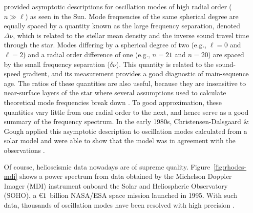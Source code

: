 \citet{1980ApJS...43..469T} provided asymptotic descriptions for oscillation modes of high radial order (${n\gg\ell}$) as seen in the Sun. 
Mode frequencies of the same spherical degree are equally spaced by a quantity known as the large frequency separation, denoted ${\Delta\nu}$, which is related to the stellar mean density and the inverse sound travel time through the star. 
Modes differing by a spherical degree of two (e.g., ${\ell=0}$ and ${\ell=2}$) and a radial order difference of one (e.g., ${n=21}$ and ${n=20}$) are spaced by the small frequency separation (${\delta\nu}$). 
This quantity is related to the sound-speed gradient, and its measurement provides a good diagnostic of main-sequence age. 
The ratios of these quantities are also useful, because they are insensitive to near-surface layers of the star where several assumptions used to calculate theoretical mode frequencies break down \citep[e.g.,][]{2003A&A...411..215R}. 
To good approximation, these quantities vary little from one radial order to the next, and hence serve as a good summary of the frequency spectrum. 
In the early 1980s, Christensen-Dalsgaard \& Gough applied this asymptotic description to oscillation modes calculated from a solar model and were able to show that the model was in agreement with the observations \citep[e.g.,][]{2002RvMP...74.1073C}. 

Of course, helioseismic data nowadays are of supreme quality. 
Figure~\ref{fig:rhodes-mdi} shows a power spectrum from data obtained by the Michelson Doppler Imager (MDI) instrument onboard the Solar and Heliospheric Observatory (SOHO), a \euro$1$~billion NASA/ESA space mission launched in 1995. 
With such data, thousands of oscillation modes have been resolved with high precision \citep[e.g.,][]{1997SoPh..175..287R}. 

